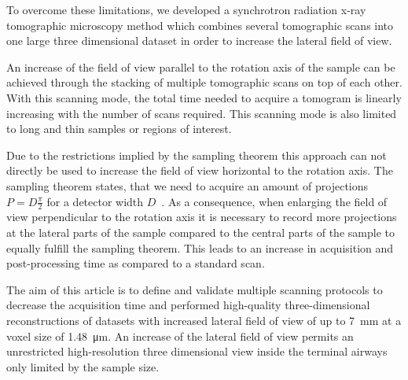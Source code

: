 To overcome these limitations, we developed a synchrotron radiation x-ray tomographic microscopy method which combines several tomographic scans into one large three dimensional dataset in order to increase the lateral field of view.

An increase of the field of view parallel to the rotation axis of the sample can be achieved through the stacking of multiple tomographic scans on top of each other. With this scanning mode, the total time needed to acquire a tomogram is linearly increasing with the number of scans required. This scanning mode is also limited to long and thin samples or regions of interest.

Due to the restrictions implied by the sampling theorem this approach can not directly be used to increase the field of view horizontal to the rotation axis. The sampling theorem states, that we need to acquire an amount of projections $P=D\frac{\pi}{2}$ for a detector width $D$~\cite[page 186]{Kak2002}. As a consequence, when enlarging the field of view perpendicular to the rotation axis it is necessary to record more projections at the lateral parts of the sample compared to the central parts of the sample to equally fulfill the sampling theorem. This leads to an increase in acquisition and post-processing time as compared to a standard scan.

The aim of this article is to define and validate multiple scanning protocols to decrease the acquisition time and performed high-quality three-dimensional reconstructions of datasets with increased lateral field of view of up to \SI{7}{\milli\meter} at a voxel size of \SI{1.48}{\micro\meter}. An increase of the lateral field of view permits an unrestricted high-resolution three dimensional view inside the terminal airways only limited by the sample size.